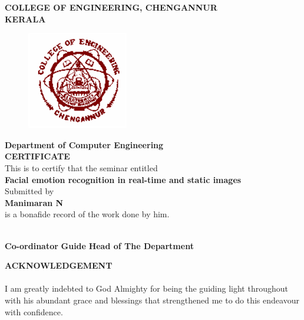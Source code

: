 \documentclass[a4paper,12pt,oneside]{article}
\begin{document}
\newpage
\thispagestyle{empty}
\begin{center}
\setlength{\baselineskip}{1.5\baselineskip}
{\large\textbf{COLLEGE OF ENGINEERING, CHENGANNUR}}
\\
{\large\textbf{KERALA}}
\\
\begin{figure}[H]
\centering
\includegraphics{ceclogo.png}
\end{figure}
\setlength{\baselineskip}{1.5\baselineskip}
\textbf{Department of Computer Engineering}
\\
\textbf{CERTIFICATE}
\\
This is to certify that the seminar entitled
\\
\textbf{Facial emotion recognition in real-time and static
images}
\\
Submitted by
\\
\textbf{Manimaran N}
\\
is a bonafide record of the work done by him.
\end{center}
\vspace{20mm}
\vspace{25ex}
\hspace{55ex}
\\
\vspace{2ex}
\hspace{0ex}
\textbf{
Co-ordinator}
\hspace{20ex}
\textbf{
Guide}
\hspace{16ex}
\textbf{
Head of The Department}
\newpage
{}


\renewcommand{\headrulewidth}{0.0pt}
\renewcommand{\footrulewidth}{0.0pt}



\begin{center}
\large{\textbf{ACKNOWLEDGEMENT}}
\end{center}
\vspace{6ex}
\setlength{\baselineskip}{1.5\baselineskip}

\paragraph{}
I am greatly indebted to God Almighty for being the guiding light throughout with his
abundant grace and blessings that strengthened me to do this endeavour with confidence.
\end{document}
